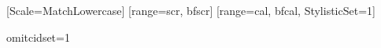 \usepackage{fontspec}
\usepackage{luatexbase}


\usepackage{amsmath}
\usepackage{amssymb}
\usepackage{mathtools}

\usepackage[
 mathrm=sym,        %
 math-style=ISO,    
 bold-style=ISO,   
 sans-style=italic,
 nabla=upright,
 partial=upright,
]{unicode-math}

\usepackage[
 locale=US,
 separate-uncertainty=true,
 per-mode=reciprocal,
]{siunitx}


\setsansfont{Libertinus Sans}
\setmonofont{Fira Mono}[Scale=MatchLowercase]
[range={scr, bfscr}]
[range={cal, bfcal}, StylisticSet=1]

\pdfvariable omitcidset=1
